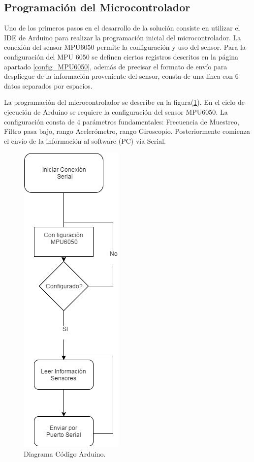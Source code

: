 \documentclass[12pt,a4paper]{article}
\begin{document}
\subsection{Programación del Microcontrolador}
Uno de los primeros pasos en el desarrollo de la solución consiste en utilizar el IDE de Arduino para realizar la programación inicial del microcontrolador. La conexión del sensor MPU6050 permite la configuración y uso del sensor.
Para la configuración del MPU 6050 se definen ciertos registros descritos en la página \pageref{config_MPU6050} apartado \ref{config_MPU6050}, además de precisar el formato de envío para despliegue de la información proveniente del sensor, consta de una línea con 6 datos separados por espacios.

La programación del microcontrolador se describe en la figura(\ref{fig:arduinocode}).
En el ciclo de ejecución de Arduino se requiere la configuración del sensor MPU6050. La configuración consta de 4 parámetros fundamentales: Frecuencia de Muestreo, Filtro pasa bajo, rango Acelerómetro, rango Giroscopio. Posteriormente comienza el envío de la información al software (PC) via Serial.

\begin{figure}[H]
	\centering
	\includegraphics[scale=0.6]{images/diagramacodigoarduino}
	\caption{Diagrama Código Arduino.}
	\label{fig:arduinocode}
\end{figure}
\end{document}
